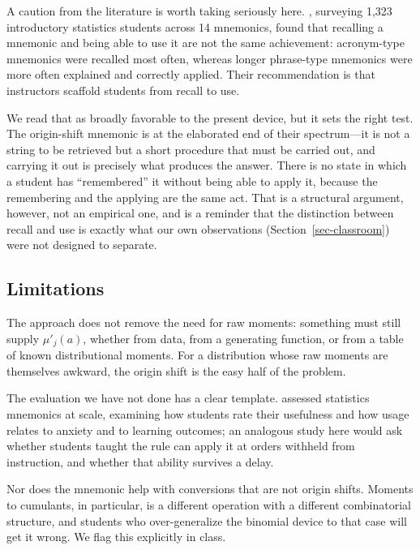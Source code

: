 \documentclass[
  12pt]{article}
\begin{document}
A caution from the literature is worth taking seriously here. \citet{mocko2024}, surveying 1,323 introductory statistics students across 14 mnemonics, found that recalling a mnemonic and being able to use it are not the same achievement: acronym-type mnemonics were recalled most often, whereas longer phrase-type mnemonics were more often explained and correctly applied. Their recommendation is that instructors scaffold students from recall to use.

We read that as broadly favorable to the present device, but it sets the right test. The origin-shift mnemonic is at the elaborated end of their spectrum---it is not a string to be retrieved but a short procedure that must be carried out, and carrying it out is precisely what produces the answer. There is no state in which a student has ``remembered'' it without being able to apply it, because the remembering and the applying are the same act. That is a structural argument, however, not an empirical one, and \citet{mocko2024} is a reminder that the distinction between recall and use is exactly what our own observations (Section~\ref{sec-classroom}) were not designed to separate.

\subsection{Limitations}

The approach does not remove the need for raw moments: something must still supply $\mu'_j(a)$, whether from data, from a generating function, or from a table of known distributional moments. For a distribution whose raw moments are themselves awkward, the origin shift is the easy half of the problem.

The evaluation we have not done has a clear template. \citet{mocko2017} assessed statistics mnemonics at scale, examining how students rate their usefulness and how usage relates to anxiety and to learning outcomes; an analogous study here would ask whether students taught the rule can apply it at orders withheld from instruction, and whether that ability survives a delay.

Nor does the mnemonic help with conversions that are not origin shifts. Moments to cumulants, in particular, is a different operation with a different combinatorial structure, and students who over-generalize the binomial device to that case will get it wrong. We flag this explicitly in class.
\end{document}
